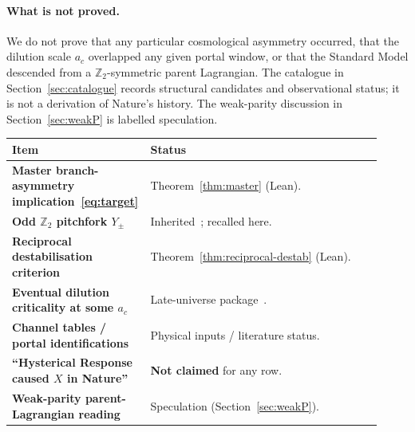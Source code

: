 \documentclass[11pt]{article}
\theoremstyle{definition}
\theoremstyle{remark}
\begin{document}
\paragraph{What is not proved.}
We do not prove that any particular cosmological asymmetry occurred, that the
dilution scale $a_c$ overlapped any given portal window, or that the Standard
Model descended from a $\mathbb Z_2$-symmetric parent Lagrangian.
The catalogue in Section~\ref{sec:catalogue} records structural candidates and
observational status; it is not a derivation of Nature's history.
The weak-parity discussion in Section~\ref{sec:weakP} is labelled speculation.

\begin{center}
\small
\begin{tabular}{@{}>{\bfseries}p{0.30\linewidth}p{0.62\linewidth}@{}}
\toprule
Item & Status\\
\midrule
Master branch-asymmetry implication~\eqref{eq:target} & Theorem~\ref{thm:master} (Lean).\\
Odd $\mathbb Z_2$ pitchfork $Y_\pm$ & Inherited~\cite{boyd2026response}; recalled here.\\
Reciprocal destabilisation criterion & Theorem~\ref{thm:reciprocal-destab} (Lean).\\
Eventual dilution criticality at some $a_c$ & Late-universe package~\cite{boyd2026late}.\\
Channel tables / portal identifications & Physical inputs / literature status.\\
``Hysterical Response caused $X$ in Nature'' & \textbf{Not claimed} for any row.\\
Weak-parity parent-Lagrangian reading & Speculation (Section~\ref{sec:weakP}).\\
\bottomrule
\end{tabular}
\end{center}
\end{document}

